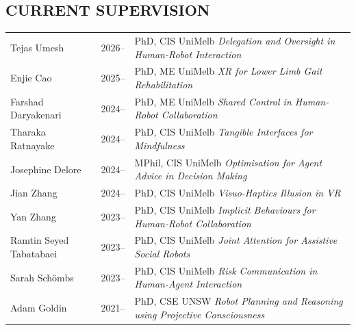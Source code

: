 
\subsection{CURRENT SUPERVISION}
\vspace{2pt}

\noindent
\begin{tabularx}{\textwidth}{@{}llX@{}}
Tejas Umesh               & 2026--      & PhD, CIS UniMelb \quad \textit{Delegation and Oversight in Human-Robot Interaction} \\[2pt]
Enjie Cao               & 2025--  & PhD, ME UniMelb \quad \textit{XR for Lower Limb Gait Rehabilitation} \\[2pt]
Farshad Daryakenari     & 2024--  & PhD, ME UniMelb \quad \textit{Shared Control in Human-Robot Collaboration} \\[2pt]
Tharaka Ratnayake       & 2024--  & PhD, CIS UniMelb \quad \textit{Tangible Interfaces for Mindfulness} \\[2pt]
Josephine Delore       & 2024--  & MPhil, CIS UniMelb \quad \textit{Optimisation for Agent Advice in Decision Making} \\[2pt]
Jian Zhang              & 2024--  & PhD, CIS UniMelb \quad \textit{Visuo-Haptics Illusion in VR} \\[2pt]
Yan Zhang               & 2023--  & PhD, CIS UniMelb \quad \textit{Implicit Behaviours for Human-Robot Collaboration} \\
Ramtin Seyed Tabatabaei & 2023--  & PhD, CIS UniMelb \quad \textit{Joint Attention for Assistive Social Robots} \\
Sarah Schömbs          & 2023--  & PhD, CIS UniMelb \quad \textit{Risk Communication in Human-Agent Interaction} \\
Adam Goldin             & 2021--  & PhD, CSE UNSW \quad \textit{Robot Planning and Reasoning using Projective Consciousness} \\
\end{tabularx}

